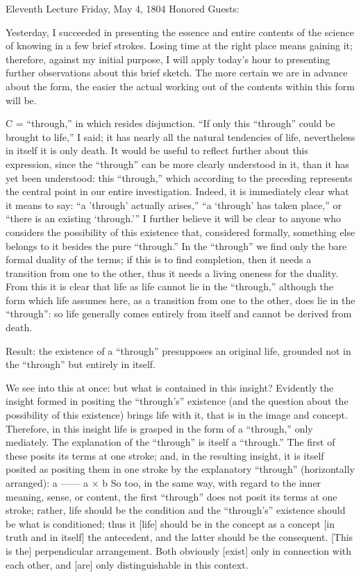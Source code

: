 Eleventh Lecture
Friday, May 4, 1804
Honored Guests:

Yesterday, I succeeded in presenting the essence
and entire contents of the science of knowing
in a few brief strokes.
Losing time at the right place means gaining it;
therefore, against my initial purpose,
I will apply today’s hour to presenting
further observations about this brief sketch.
The more certain we are in advance about the form,
the easier the actual working out
of the contents within this form will be.

C = “through,” in which resides disjunction.
“If only this “through” could be brought to life,” I said;
it has nearly all the natural tendencies of life,
nevertheless in itself it is only death.
It would be useful to reflect further about this expression,
since the “through” can be more clearly understood in it,
than it has yet been understood:
this “through,” which according to the preceding
represents the central point in our entire investigation.
Indeed, it is immediately clear
what it means to say:
“a 'through' actually arises,”
“a ‘through’ has taken place,”
or “there is an existing ‘through.’”
I further believe it will be clear
to anyone who considers the possibility of this existence that,
considered formally, something else belongs to it
besides the pure “through.”
In the “through” we find only
the bare formal duality of the terms;
if this is to find completion,
then it needs a transition from one to the other,
thus it needs a living oneness for the duality.
From this it is clear that life as life cannot lie in the “through,”
although the form which life assumes here,
as a transition from one to the other,
does lie in the “through”:
so life generally comes entirely from itself
and cannot be derived from death.

Result: the existence of a “through”
presupposes an original life,
grounded not in the “through”
but entirely in itself.

We see into this at once:
but what is contained in this insight?
Evidently the insight formed in positing
the “through’s” existence
(and the question about the possibility of this existence)
brings life with it,
that is in the image and concept.
Therefore, in this insight life is grasped
in the form of a “through,” only mediately.
The explanation of the “through” is itself a “through.”
The first of these posits its terms at one stroke;
and, in the resulting insight,
it is itself posited as positing them in one stroke
by the explanatory “through” (horizontally arranged):
a
——
a × b
So too, in the same way, with regard to
the inner meaning, sense, or content,
the first “through” does not posit
its terms at one stroke;
rather, life should be the condition
and the “through’s” existence should be
what is conditioned;
thus it [life] should be in the concept as a concept
[in truth and in itself] the antecedent,
and the latter should be the consequent.
[This is the] perpendicular arrangement.
Both obviously [exist] only in connection with
each other, and [are] only distinguishable in this context.

